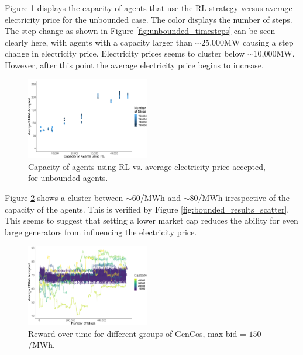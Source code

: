 Figure \ref{fig:unbounded_results_scatter} displays the capacity of agents that use the RL strategy versus average electricity price for the unbounded case. The color displays the number of steps. The step-change as shown in Figure \ref{fig:unbounded_timesteps} can be seen clearly here, with agents with a capacity larger than ${\sim}$25,000MW causing a step change in electricity price. Electricity prices seems to cluster below ${\sim}$10,000MW. However, after this point the average electricity price begins to increase.



\begin{figure}
	\includegraphics[width=0.48\textwidth]{figures/results/unbounded_results_scatter.pdf}
	\caption{Capacity of agents using RL vs. average electricity price accepted, for unbounded agents.}
	\label{fig:unbounded_results_scatter}
\end{figure}



Figure \ref{fig:bounded_timesteps} shows a cluster between ${\sim}$\textsterling$60$/MWh and ${\sim}$\textsterling$80$/MWh irrespective of the capacity of the agents. This is verified by Figure \ref{fig:bounded_results_scatter}. This seems to suggest that setting a lower market cap reduces the ability for even large generators from influencing the electricity price.


\begin{figure}
	\includegraphics[width=0.48\textwidth]{figures/results/bounded_results.pdf}
	\caption{Reward over time for different groups of GenCos, max bid = \textsterling $150$/MWh.}
	\label{fig:bounded_timesteps}
\end{figure}





